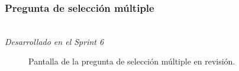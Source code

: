 \newpage

\subsubsection{Pregunta de selección múltiple}\mbox{}\\
\label{sec:pregunic1b}
\textit{Desarrollado en el Sprint 6}

\begin{figure}[H]%
  \centering
  \qquad
  \caption{Pantalla de la pregunta de selección múltiple en revisión.}%
  \label{fig:example}%
\end{figure}

